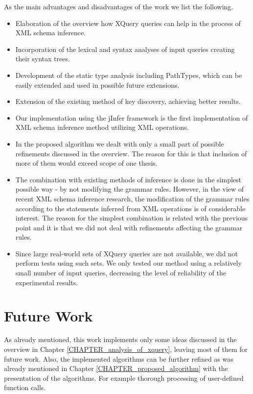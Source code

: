 As the main advantages and disadvantages of the work we list the following.
\begin{itemize}
\renewcommand{\labelitemi}{$+$}
\item Elaboration of the overview how XQuery queries can help in the process of XML schema inference.
\item Incorporation of the lexical and syntax analyses of input queries creating their syntax trees.
\item Development of the static type analysis including PathTypes, which can be easily extended and used in possible future extensions.
\item Extension of the existing method of key discovery, achieving better results.
\item Our implementation using the jInfer framework is the first implementation of XML schema inference method utilizing XML operations.
\renewcommand{\labelitemi}{$-$}
\item In the proposed algorithm we dealt with only a small part of possible refinements discussed in the overview. The reason for this is that inclusion of more of them would exceed scope of one thesis.
\item The combination with existing methods of inference is done in the simplest possible way - by not modifying the grammar rules. However, in the view of recent XML schema inference research, the modification of the grammar rules according to the statements inferred from XML operations is of considerable interest. The reason for the simplest combination is related with the previous point and it is that we did not deal with refinements affecting the grammar rules.
\item Since large real-world sets of XQuery queries are not available, we did not perform tests using such sets. We only tested our method using a relatively small number of input queries, decreasing the level of reliability of the experimental results.
\end{itemize}

\section{Future Work}
As already mentioned, this work implements only some ideas discussed in the overview in Chapter \ref{CHAPTER_analysis_of_xquery}, leaving most of them for future work. Also, the implemented algorithms can be further refined as was already mentioned in Chapter \ref{CHAPTER_proposed_algorithm} with the presentation of the algorithms. For example thorough processing of user-defined function calls.


